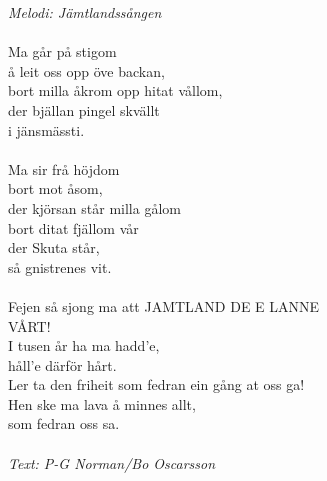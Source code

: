 {\footnotesize\textit{Melodi: Jämtlandssången}}\\
\\
Ma går på stigom\\
å leit oss opp öve backan,\\
bort milla åkrom opp hitat vållom,\\
der bjällan pingel skvällt\\
i jänsmässti.\\
\\
Ma sir frå höjdom\\
bort mot åsom,\\
der kjörsan står milla gålom\\
bort ditat fjällom vår\\
der Skuta står,\\
så gnistrenes vit.\\
\\
\revrpt Fejen så sjong ma att JAMTLAND DE E LANNE\\
VÅRT!\\
I tusen år ha ma hadd’e,\\
håll’e därför hårt.\\
Ler ta den friheit som fedran ein gång at oss ga!\\
Hen ske ma lava å minnes allt,\\
som fedran oss sa.\rpt\\
\\
{\footnotesize\textit{Text: P-G Norman/Bo Oscarsson}}
